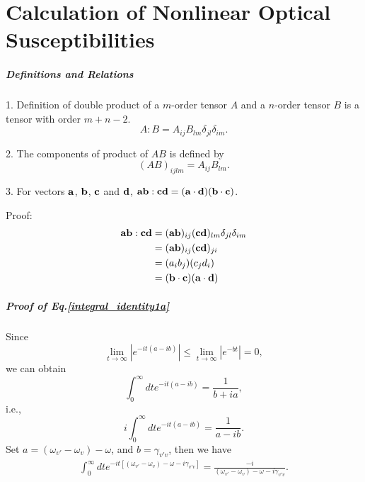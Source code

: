 \chapter{Calculation of Nonlinear Optical Susceptibilities}\label{calculation_of_chi}

\paragraph{Definitions and Relations}

1. Definition of double product of a $m$-order tensor $A$ and a $n$-order tensor $B$ is a tensor with order $m+n-2$.
\begin{equation}
    A:B=A_{ij}B_{lm}\delta_{jl}\delta_{im}.
\label{tensor_double_product}
\end{equation}

2. The components of product of $AB$ is defined by 
\begin{equation}
    (AB)_{ijlm}=A_{ij}B_{lm}.
\label{tensor_product}
\end{equation}

3. For vectors $\bf{a}$, $\bf{b}$, $\bf{c}$ and $\bf{d}$, ${\bf{ab}}:{\bf{cd}}=({\bf{a}}\cdot {\bf{d}})({\bf{b}}\cdot{\bf{c}})$.

Proof:
\begin{align}
    {\bf{ab}}:{\bf{cd}}&=({\bf{ab}})_{ij}({\bf{cd}})_{lm}\delta_{jl}\delta_{im} \nonumber \\
    &=({\bf{ab}})_{ij}({\bf{cd}})_{ji} \nonumber\\
    &=(a_i b_j)(c_j d_i) \nonumber\\
    &=({\bf{b}}\cdot{\bf{c}})({\bf{a}}\cdot{\bf{d}})
\end{align}

\paragraph{Proof of Eq.\space\ref{integral_identity1a}}
Since 
\begin{equation}
  \lim_{t\to\infty} |e^{-it(a-ib)}|\le \lim_{t\to\infty} |e^{-bt}| = 0,
  \label{integral_identity0}
\end{equation}
we can obtain
\begin{equation}
  \int_0^\infty dt e^{-it(a-ib)}=\frac{1}{b+ia},
  \label{integral_identity0}
\end{equation}
i.e.,
\begin{equation}
  i\int_0^\infty dt e^{-it(a-ib)}=\frac{1}{a-ib}.
  \label{integral_identity1}
\end{equation}
Set $a = (\omega_{v'} - \omega_{v}) - \omega$, and $b = \gamma_{v'v}$,
then we have
 \begin{align}
 \int_0^\infty dt e^{-it[(\omega_{v'}-\omega_v)-\omega-i\gamma_{v'v}]}=\frac{-i}{(\omega_{v'} -\omega_v)-\omega-i\gamma_{v'v}}.\nonumber
 \end{align}
